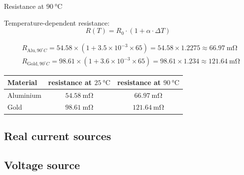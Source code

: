 {Resistance at \(\SI{90}{\celsius}\)

Temperature-dependent resistance:
\[
R(T) = R_0 \cdot \left( 1 + \alpha \cdot \Delta T \right)
\]

\begin{align*}
&R_{\text{Alu},90^\circ C} = 54.58 \times (1 + 3.5 \times 10^{-3} \times 65) = 54.58 \times 1.2275 \approx \SI{66.97}{\milli\ohm} \\
&R_{\text{Gold},90^\circ C} = 98.61 \times (1 + 3.6 \times 10^{-3} \times 65) = 98.61 \times 1.234 \approx \SI{121.64}{\milli\ohm}
\end{align*}


\begin{tabular}{lcc}
\toprule
Material & resistance at \(\SI{25}{\celsius}\) & resistance at \(\SI{90}{\celsius}\) \\
\midrule
Aluminium & \(\SI{54.58}{\milli\ohm}\) & \(\SI{66.97}{\milli\ohm}\) \\
Gold & \(\SI{98.61}{\milli\ohm}\) & \(\SI{121.64}{\milli\ohm}\) \\
\bottomrule
\end{tabular}




}

\subsection{Real current sources}


\subsection{Voltage source}
\Loesung{
\[
R_\text{ges} = R_1 + R_2 = 2 + 4 = \SI{6}{\ohm}, \quad
I = \frac{U}{R_\text{ges}} = \frac{10}{6} = \SI{1.67}{\ampere}
\]

\[
U_{R_1} = I \cdot R_1 = 1.67 \cdot 2 = \SI{3.33}{\volt}, \quad
U_{R_2} = U - U_{R_1} = \SI{6.67}{\volt}
\]

\[
I_{R_2} = \frac{U_{R_2}}{R_2} = \frac{6.67}{4} = \SI{1.67}{\ampere}
\]
}

